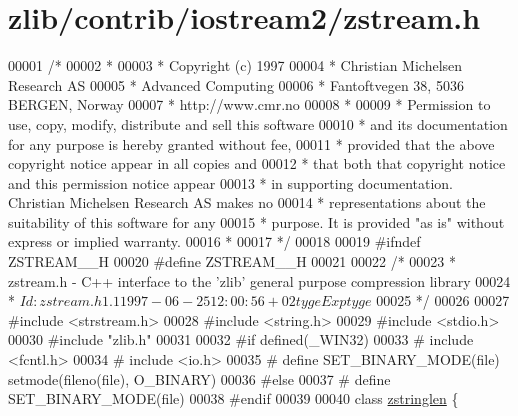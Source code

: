 \hypertarget{zlib_2contrib_2iostream2_2zstream_8h_source}{}\section{zlib/contrib/iostream2/zstream.h}
\label{zlib_2contrib_2iostream2_2zstream_8h_source}

\begin{DoxyCode}
00001 \textcolor{comment}{/*}
00002 \textcolor{comment}{ *}
00003 \textcolor{comment}{ * Copyright (c) 1997}
00004 \textcolor{comment}{ * Christian Michelsen Research AS}
00005 \textcolor{comment}{ * Advanced Computing}
00006 \textcolor{comment}{ * Fantoftvegen 38, 5036 BERGEN, Norway}
00007 \textcolor{comment}{ * http://www.cmr.no}
00008 \textcolor{comment}{ *}
00009 \textcolor{comment}{ * Permission to use, copy, modify, distribute and sell this software}
00010 \textcolor{comment}{ * and its documentation for any purpose is hereby granted without fee,}
00011 \textcolor{comment}{ * provided that the above copyright notice appear in all copies and}
00012 \textcolor{comment}{ * that both that copyright notice and this permission notice appear}
00013 \textcolor{comment}{ * in supporting documentation.  Christian Michelsen Research AS makes no}
00014 \textcolor{comment}{ * representations about the suitability of this software for any}
00015 \textcolor{comment}{ * purpose.  It is provided "as is" without express or implied warranty.}
00016 \textcolor{comment}{ *}
00017 \textcolor{comment}{ */}
00018 
00019 \textcolor{preprocessor}{#ifndef ZSTREAM\_\_H}
00020 \textcolor{preprocessor}{#define ZSTREAM\_\_H}
00021 
00022 \textcolor{comment}{/*}
00023 \textcolor{comment}{ * zstream.h - C++ interface to the 'zlib' general purpose compression library}
00024 \textcolor{comment}{ * $Id: zstream.h 1.1 1997-06-25 12:00:56+02 tyge Exp tyge $}
00025 \textcolor{comment}{ */}
00026 
00027 \textcolor{preprocessor}{#include <strstream.h>}
00028 \textcolor{preprocessor}{#include <string.h>}
00029 \textcolor{preprocessor}{#include <stdio.h>}
00030 \textcolor{preprocessor}{#include "zlib.h"}
00031 
00032 \textcolor{preprocessor}{#if defined(\_WIN32)}
00033 \textcolor{preprocessor}{#   include <fcntl.h>}
00034 \textcolor{preprocessor}{#   include <io.h>}
00035 \textcolor{preprocessor}{#   define SET\_BINARY\_MODE(file) setmode(fileno(file), O\_BINARY)}
00036 \textcolor{preprocessor}{#else}
00037 \textcolor{preprocessor}{#   define SET\_BINARY\_MODE(file)}
00038 \textcolor{preprocessor}{#endif}
00039 
00040 \textcolor{keyword}{class }\hyperlink{classzstringlen}{zstringlen} \{

\end{DoxyCode}
